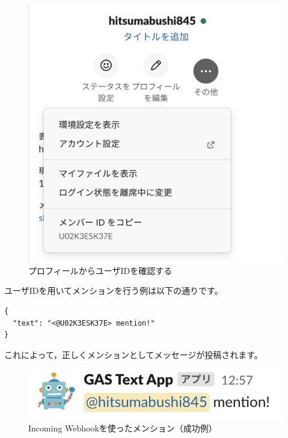 \documentclass[uplatex,a4j]{jsarticle}
\begin{document}
\begin{figure}[H]
 \centering
 \includegraphics[keepaspectratio, scale=0.6]{images/check_slack_userid.png}
 \caption{プロフィールからユーザIDを確認する}
 \label{fig:check_slack_userid}
\end{figure}

ユーザIDを用いてメンションを行う例は以下の通りです。

\begin{lstlisting}[basicstyle=\ttfamily\footnotesize,frame=single,caption=mention payload sample2,label=mrkdwnmentionpayloadsuccess]
{
  "text": "<@U02K3ESK37E> mention!"
}
\end{lstlisting}

これによって，正しくメンションとしてメッセージが投稿されます。

\begin{figure}[H]
 \centering
 \includegraphics[keepaspectratio, scale=0.8]{images/mention2.png}
 \caption{Incoming Webhookを使ったメンション（成功例）}
 \label{fig:mention2}
\end{figure}
\end{document}
